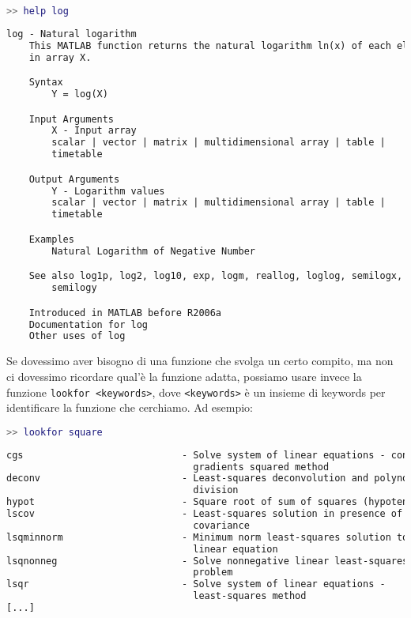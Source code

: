 \begin{terminal}
    \begin{lstlisting}[language=MATLAB, style=notexterm]
>> help log\end{lstlisting}
    \tcblower
    \begin{lstlisting}[style=notexterm, language = tex]
 log - Natural logarithm
    This MATLAB function returns the natural logarithm ln(x) of each element
    in array X.

    Syntax
        Y = log(X)

    Input Arguments
        X - Input array
        scalar | vector | matrix | multidimensional array | table |
        timetable

    Output Arguments
        Y - Logarithm values
        scalar | vector | matrix | multidimensional array | table |
        timetable

    Examples
        Natural Logarithm of Negative Number

    See also log1p, log2, log10, exp, logm, reallog, loglog, semilogx,
        semilogy

    Introduced in MATLAB before R2006a
    Documentation for log
    Other uses of log\end{lstlisting}
\end{terminal}

Se dovessimo aver bisogno di una funzione che svolga un certo compito, ma non ci dovessimo ricordare qual'è la funzione adatta, possiamo usare invece la funzione \texttt{lookfor <keywords>}, dove \texttt{<keywords>} è un insieme di keywords per identificare la funzione che cerchiamo. Ad esempio:

\begin{terminal}
    \begin{lstlisting}[language=MATLAB, style=notexterm]
>> lookfor square\end{lstlisting}
    \tcblower
    \begin{lstlisting}[style=notexterm, language = tex]
cgs                            - Solve system of linear equations - conjugate
                                 gradients squared method
deconv                         - Least-squares deconvolution and polynomial 
                                 division
hypot                          - Square root of sum of squares (hypotenuse)
lscov                          - Least-squares solution in presence of known 
                                 covariance
lsqminnorm                     - Minimum norm least-squares solution to 
                                 linear equation
lsqnonneg                      - Solve nonnegative linear least-squares 
                                 problem
lsqr                           - Solve system of linear equations - 
                                 least-squares method
[...]\end{lstlisting}
\end{terminal}

